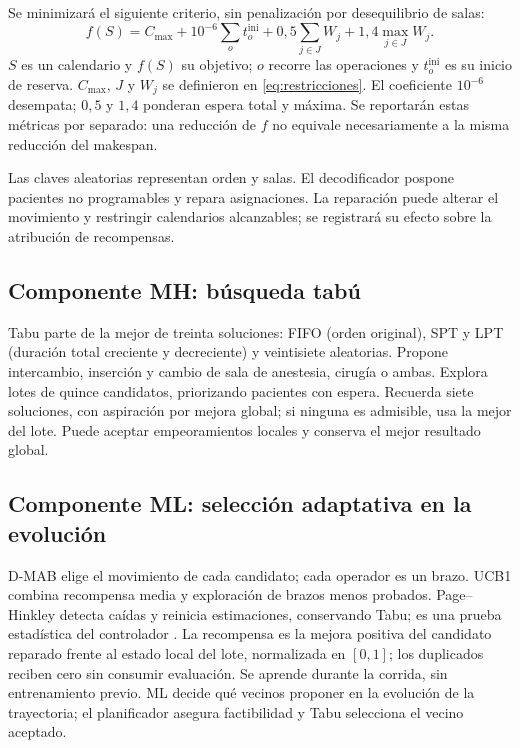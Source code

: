 \documentclass[12pt,letterpaper]{report}
\begin{document}
Se minimizará el siguiente criterio, sin penalización por desequilibrio de salas:
\begin{equation}
 f(S)=C_{\max}+10^{-6}\sum_o t_o^{\mathrm{ini}}
        +0{,}5\sum_{j\in J}W_j+1{,}4\max_{j\in J}W_j.
 \label{eq:objetivo}
\end{equation}
\noindent $S$ es un calendario y $f(S)$ su objetivo; $o$ recorre las
operaciones y $t_o^{\mathrm{ini}}$ es su inicio de reserva. $C_{\max}$, $J$
y $W_j$ se definieron en \eqref{eq:restricciones}. El coeficiente $10^{-6}$
desempata; $0{,}5$ y $1{,}4$ ponderan espera total y máxima. Se reportarán
estas métricas por separado: una reducción de $f$ no equivale necesariamente
a la misma reducción del makespan.

Las claves aleatorias representan orden y salas. El decodificador pospone
pacientes no programables y repara asignaciones. La reparación puede alterar
el movimiento y restringir calendarios alcanzables; se registrará su efecto
sobre la atribución de recompensas.

\subsection{Componente MH: búsqueda tabú}
Tabu parte de la mejor de treinta soluciones: FIFO (orden original),
SPT y LPT (duración total creciente y decreciente) y veintisiete aleatorias.
Propone intercambio, inserción y cambio de sala de anestesia,
cirugía o ambas. Explora lotes de quince candidatos, priorizando pacientes
con espera. Recuerda siete soluciones, con aspiración por mejora global;
si ninguna es admisible, usa la mejor del lote. Puede aceptar empeoramientos
locales y conserva el mejor resultado global.

\subsection{Componente ML: selección adaptativa en la evolución}
D-MAB elige el movimiento de cada candidato; cada operador es un brazo.
UCB1 combina recompensa media y exploración de brazos menos probados.
Page--Hinkley detecta caídas y reinicia estimaciones, conservando Tabu;
es una prueba estadística del controlador \parencite{dacosta2008}.
La recompensa es la mejora positiva del candidato reparado frente al estado
local del lote, normalizada en $[0,1]$; los duplicados reciben cero sin
consumir evaluación. Se aprende durante la corrida, sin entrenamiento previo.
ML decide qué vecinos proponer en la evolución de la trayectoria;
el planificador asegura factibilidad y Tabu selecciona el vecino aceptado.
\end{document}
